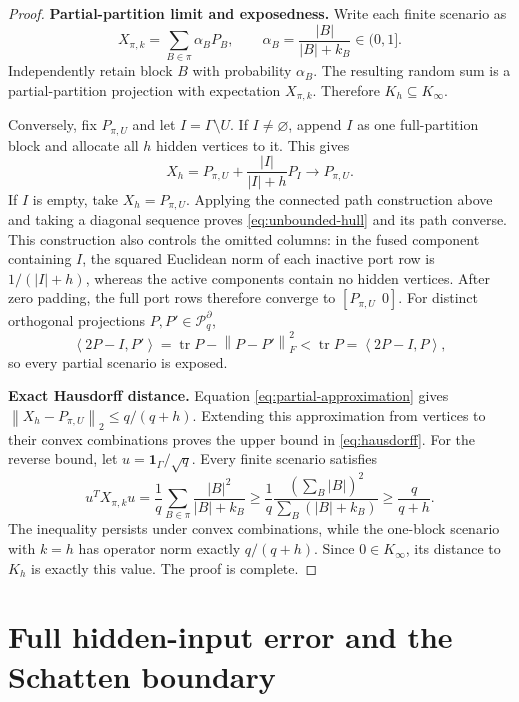 \documentclass[journal,10pt]{IEEEtran}
\theoremstyle{definition}
\theoremstyle{remark}
\newcommand{\one}{\mathbf 1}
\newcommand{\tr}{\operatorname{tr}}
\newcommand{\cP}{\mathcal P}
\newcommand{\ip}[2]{\left\langle #1,#2\right\rangle}
\newcommand{\norm}[1]{\left\lVert #1\right\rVert}
\begin{document}
\begin{proof}
\textbf{Partial-partition limit and exposedness.}
Write each finite scenario as
\[
  X_{\pi,k}=\sum_{B\in\pi}\alpha_BP_B,
  \qquad \alpha_B=\frac{|B|}{|B|+k_B}\in(0,1].
\]
Independently retain block $B$ with probability $\alpha_B$.  The resulting
random sum is a partial-partition projection with expectation $X_{\pi,k}$.
Therefore $K_h\subseteq K_\infty$.

Conversely, fix $P_{\pi,U}$ and let $I=\Gamma\setminus U$.  If $I\neq
\varnothing$, append $I$ as one full-partition block and allocate all $h$
hidden vertices to it.  This gives
\begin{equation}
  X_h=P_{\pi,U}+\frac{|I|}{|I|+h}P_I\longrightarrow P_{\pi,U}.
  \label{eq:partial-approximation}
\end{equation}
If $I$ is empty, take $X_h=P_{\pi,U}$.  Applying the connected path
construction above and taking a diagonal sequence proves
\eqref{eq:unbounded-hull} and its path converse.  This construction also
controls the omitted columns: in the fused component containing $I$, the
squared Euclidean norm of each inactive port row is $1/(|I|+h)$, whereas the
active components contain no hidden vertices.  After zero padding, the full
port rows therefore converge to $[P_{\pi,U}\ \ 0]$.  For distinct orthogonal
projections $P,P'\in\cP_q^\partial$,
\begin{equation}
  \ip{2P-I}{P'}
  =\tr P-\norm{P-P'}_F^2
  <\tr P=\ip{2P-I}{P},
  \label{eq:partial-exposed}
\end{equation}
so every partial scenario is exposed.

\textbf{Exact Hausdorff distance.}
Equation \eqref{eq:partial-approximation} gives
$\norm{X_h-P_{\pi,U}}_2\leq q/(q+h)$.  Extending this approximation from
vertices to their convex combinations proves the upper bound in
\eqref{eq:hausdorff}.  For the reverse bound, let
$u=\one_\Gamma/\sqrt q$.  Every finite scenario satisfies
\begin{equation}
 u^TX_{\pi,k}u
 =\frac1q\sum_{B\in\pi}\frac{|B|^2}{|B|+k_B}
 \geq\frac1q\frac{(\sum_B|B|)^2}{\sum_B(|B|+k_B)}
 \geq\frac{q}{q+h}.
 \label{eq:hausdorff-lower}
\end{equation}
The inequality persists under convex combinations, while the one-block
scenario with $k=h$ has operator norm exactly $q/(q+h)$.  Since
$0\in K_\infty$, its distance to $K_h$ is exactly this value.  The proof is
complete.
\end{proof}

\section{Full hidden-input error and the Schatten boundary}
\end{document}

